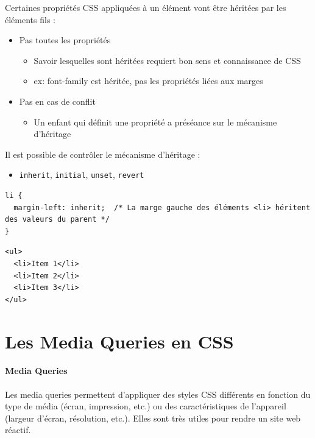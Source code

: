 \documentclass{report}
\begin{document}
\begin{multicols*}{2}
Certaines propriétés CSS appliquées à un élément vont être héritées par les éléments fils :
\begin{itemize}
    \item Pas toutes les propriétés
        \begin{itemize}
            \item Savoir lesquelles sont héritées requiert bon sens et connaissance de CSS
            \item ex: font-family est héritée, pas les propriétés liées aux marges
        \end{itemize}
    \item Pas en cas de conflit
        \begin{itemize}
            \item Un enfant qui définit une propriété a préséance sur le mécanisme d’héritage
        \end{itemize}
\end{itemize}

Il est possible de contrôler le mécanisme d’héritage :
\begin{itemize}
    \item \texttt{inherit}, \texttt{initial}, \texttt{unset}, \texttt{revert}
\end{itemize}

\begin{lstlisting}[style=CSSDraculaLight]
li {
  margin-left: inherit;  /* La marge gauche des éléments <li> héritent des valeurs du parent */
}
\end{lstlisting}

\begin{lstlisting}[style=HTMLDraculaDark]
<ul>
  <li>Item 1</li>
  <li>Item 2</li>
  <li>Item 3</li>
</ul>
\end{lstlisting}


\section{Les Media Queries en CSS}

\paragraph{Media Queries}
Les media queries permettent d'appliquer des styles CSS différents en fonction du type de média (écran, impression, etc.) ou des caractéristiques de l'appareil (largeur d'écran, résolution, etc.). Elles sont très utiles pour rendre un site web réactif.


\end{multicols*}
\end{document}
